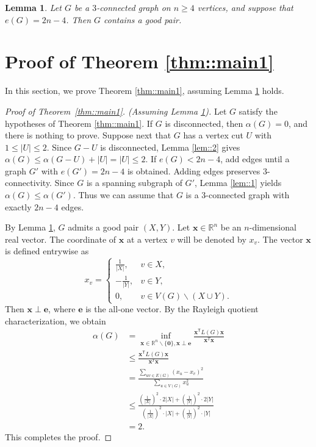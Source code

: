 \documentclass[11pt]{article}
\newtheorem{lem}[thm]{Lemma}
\theoremstyle{definition}
\begin{document}
\begin{lem}\label{thm::main2}
  Let $G$ be a $3$-connected graph on $n\geq 4$ vertices, and suppose that $e(G)=2n-4$. Then $G$ contains a good pair.
\end{lem}



\section{Proof of Theorem \ref{thm::main1}}

In this section, we prove Theorem \ref{thm::main1}, assuming Lemma \ref{thm::main2} holds.

\begin{proof}[Proof of Theorem~\ref{thm::main1}. (Assuming Lemma \ref{thm::main2})]
  Let $G$ satisfy the hypotheses of Theorem \ref{thm::main1}. If $G$ is disconnected, then $\alpha(G)=0$, and there is nothing to prove. Suppose next that $G$ has a vertex cut $U$ with $1\leq |U|\leq 2$. Since $G-U$ is disconnected, Lemma \ref{lem::2} gives $\alpha(G)\leq \alpha(G-U)+|U|=|U|\leq 2$. If $e(G)<2n-4$, add edges until a graph $G'$ with $e(G')=2n-4$ is obtained. Adding edges preserves $3$-connectivity. Since $G$ is a spanning subgraph of $G'$, Lemma \ref{lem::1} yields $\alpha(G)\leq \alpha(G')$. Thus we can assume that $G$ is a $3$-connected graph with exactly $2n-4$ edges.

  By Lemma \ref{thm::main2}, $G$ admits a good pair $(X,Y)$. Let $\mathbf{x}\in\mathbb{R}^n$ be an $n$-dimensional real vector. The coordinate of \(\mathbf x\) at a vertex $v$ will be denoted by \(x_v\). The vector $\mathbf{x}$ is defined entrywise as
  $$
    x_v=
    \begin{cases}
      \frac{1}{|X|},  & v\in X,                        \\
      -\frac{1}{|Y|}, & v\in Y,                        \\
      0,              & v\in V(G)\backslash (X\cup Y).
    \end{cases}
  $$
  Then $\mathbf x \perp \mathbf e$, where $\mathbf e$ is the all-one vector. By the Rayleigh quotient characterization, we obtain
  $$
    \begin{aligned}
      \alpha (G) & =\inf_{\mathbf{x}\in\mathbb{R}^n\backslash{\{\mathbf 0\}}, \mathbf x \perp \mathbf e} \frac{\mathbf x^{\mathsf T}L(G)\mathbf x}{\mathbf x^{T} \mathbf x} \\
                 & \leq \frac{\mathbf x^{\mathsf T}L(G)\mathbf x}{\mathbf x^{T} \mathbf x}                                                                                  \\
                 & =\frac{\sum_{uv \in E(G)}(x_{u}-x_{v})^2}{\sum_{u \in V(G)}x_{u}^{2}}                                                                                    \\
                 & \le \frac{(\frac{1}{|X|})^2 \cdot 2|X|+(\frac{1}{|Y|})^2 \cdot 2|Y|}{(\frac{1}{|X|})^2 \cdot |X|+(\frac{1}{|Y|})^2 \cdot |Y|}                            \\
                 & =2.
    \end{aligned}
  $$
  This completes the proof.
\end{proof}
\end{document}
